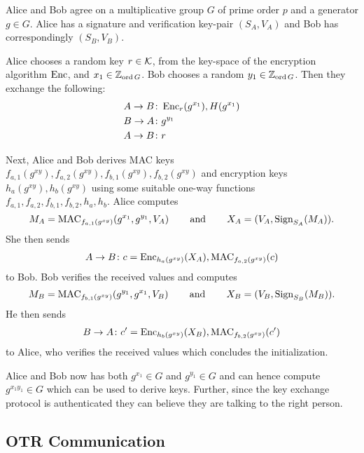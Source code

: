 \begin{protocol}\label{prot:otrinit}
  Alice and Bob agree on a multiplicative group \(G\) of prime order \(p\) and 
  a generator \(g\in G\).
  Alice has a signature and verification key-pair \((S_A, V_A)\) and Bob has 
  correspondingly \((S_B, V_B)\).

  Alice chooses a random key \(r\in \mathcal K\), from the key-space of the encryption 
  algorithm \(\operatorname{\mathrm{Enc}}\), and \(x_1\in \mathbb Z_{\operatorname{ord} G}\).
  Bob chooses a random \(y_1\in \mathbb Z_{\operatorname{ord} G}\).
  Then they exchange the following:
  \begin{align*}
    A\to B &\colon \operatorname{\mathrm{Enc}}_r( g^{x_1} ), H( g^{x_1} ) \\
    B\to A &\colon g^{y_1} \\
    A\to B &\colon r
  \end{align*}

  Next, Alice and Bob derives \ac{MAC} keys \(f_{a,1}( g^{xy} ), f_{a,2}( 
  g^{xy} ), f_{b,1}( g^{xy} ), f_{b,2}( g^{xy} )\) and encryption keys \(h_a( 
  g^{xy} ), h_b( g^{xy} )\) using some suitable one-way functions \(f_{a,1}, 
  f_{a,2}, f_{b,1}, f_{b,2}, h_a, h_b\).
  Alice computes \[M_A = \operatorname{\mathrm{MAC}}_{f_{a,1}(g^{xy})}( g^{x_1}, g^{y_1}, V_A 
  )\operatorname{\qquad and\qquad} X_A = ( V_A, \operatorname{\mathrm{Sign}}_{S_A}( M_A ) ).\]
  She then sends
  \begin{align*}
    A\to B\colon c = \operatorname{\mathrm{Enc}}_{h_a(g^{xy})}( X_A ), \operatorname{\mathrm{MAC}}_{f_{a,2}(g^{xy})}( c )
  \end{align*}
  to Bob.
  Bob verifies the received values and computes \[M_B = \operatorname{\mathrm{MAC}}_{f_{b,1}(g^{xy})}( 
    g^{y_1}, g^{x_1}, V_B )\operatorname{\qquad and\qquad} X_B = ( V_B, \operatorname{\mathrm{Sign}}_{S_B}( M_B ) ).\]
  He then sends
  \begin{align*}
    B\to A\colon c^\prime = \operatorname{\mathrm{Enc}}_{h_b(g^{xy})}( X_B ), \operatorname{\mathrm{MAC}}_{f_{b,2}(g^{xy})}( 
    c^\prime )
  \end{align*}
  to Alice, who verifies the received values which concludes the 
  initialization.
\end{protocol}

Alice and Bob now has both \(g^{x_1}\in G\) and \(g^{y_1}\in G\) and can hence 
compute \(g^{x_1 y_1}\in G\) which can be used to derive keys.
Further, since the key exchange protocol is authenticated they can believe they 
are talking to the right person.

\subsection{\acs{OTR} Communication}

